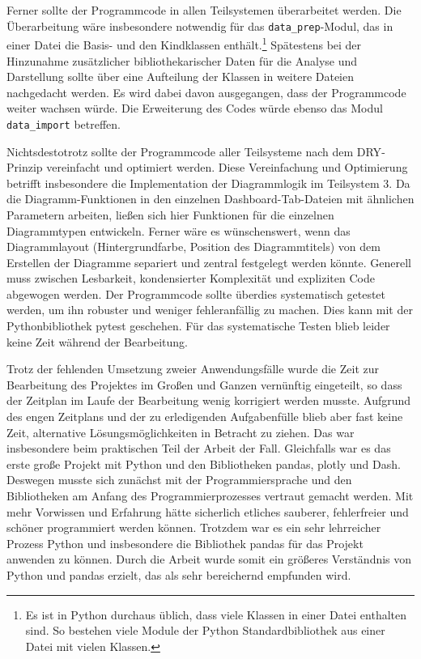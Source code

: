 Ferner sollte der Programmcode in allen Teilsystemen überarbeitet werden. Die Überarbeitung wäre insbesondere notwendig für das \texttt{data\_prep}-Modul, 
das in einer Datei die Basis- und den Kindklassen enthält.\footnote{Es ist in Python durchaus üblich, dass viele Klassen in einer Datei enthalten sind. 
So bestehen viele Module der Python Standardbibliothek aus einer Datei mit vielen Klassen.}
Spätestens bei der Hinzunahme zusätzlicher bibliothekarischer Daten für die Analyse und Darstellung sollte über eine Aufteilung der Klassen in weitere Dateien nachgedacht werden. 
Es wird dabei davon ausgegangen, dass der Programmcode weiter wachsen würde. Die Erweiterung des Codes würde ebenso das Modul \texttt{data\_import} betreffen. 

Nichtsdestotrotz sollte der Programmcode aller Teilsysteme nach dem \acrfull{DRY}-Prinzip vereinfacht und optimiert werden. 
Diese Vereinfachung und Optimierung betrifft insbesondere die Implementation der Diagrammlogik im Teilsystem 3. Da die Diagramm-Funktionen in den einzelnen Dashboard-Tab-Dateien mit ähnlichen Parametern arbeiten, 
ließen sich hier Funktionen für die einzelnen Diagrammtypen entwickeln. Ferner wäre es wünschenswert, wenn das Diagrammlayout (Hintergrundfarbe, Position des Diagrammtitels) 
von dem Erstellen der Diagramme separiert und zentral festgelegt werden könnte. 
Generell muss zwischen Lesbarkeit, kondensierter Komplexität und expliziten Code abgewogen werden. %
Der Programmcode sollte überdies systematisch getestet werden, um ihn robuster und weniger fehleranfällig zu machen. 
Dies kann mit der Pythonbibliothek pytest geschehen. Für das systematische Testen blieb leider keine Zeit während der Bearbeitung.

Trotz der fehlenden Umsetzung zweier Anwendungsfälle wurde die Zeit zur Bearbeitung des Projektes im Großen und Ganzen vernünftig eingeteilt, 
so dass der Zeitplan im Laufe der Bearbeitung wenig korrigiert werden musste. Aufgrund des engen Zeitplans und der zu erledigenden Aufgabenfülle
blieb aber fast keine Zeit, alternative Lösungsmöglichkeiten in Betracht zu ziehen. 
Das war insbesondere beim praktischen Teil der Arbeit der Fall. Gleichfalls war es das erste große Projekt mit Python und den Bibliotheken pandas, plotly und Dash.
Deswegen musste sich zunächst mit der Programmiersprache und den Bibliotheken am Anfang des Programmierprozesses vertraut gemacht werden.
Mit mehr Vorwissen und Erfahrung hätte sicherlich etliches sauberer, fehlerfreier und schöner programmiert werden können. 
Trotzdem war es ein sehr lehrreicher Prozess Python und insbesondere die Bibliothek pandas für das Projekt anwenden zu können. 
Durch die Arbeit wurde somit ein größeres Verständnis von Python und pandas erzielt, das als sehr bereichernd empfunden wird.


